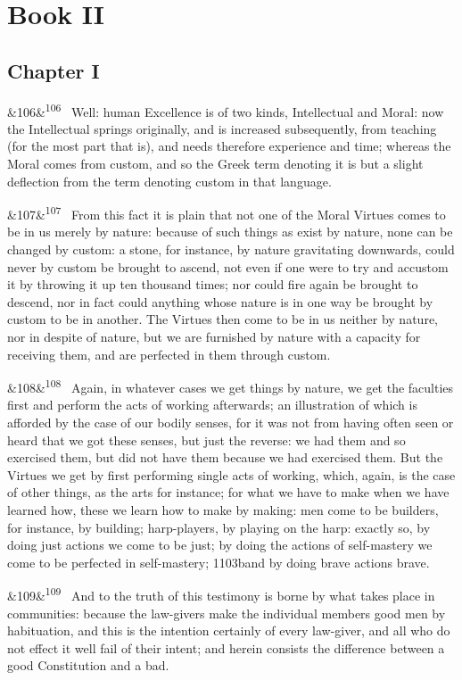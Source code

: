 \documentclass[12pt]{article}
\newcommand{\para}[1][]{\par\noindent\ifx&#1&\else\textsuperscript{\footnotesize #1}~\fi}
\begin{document}
\section*{Book II}

\subsection*{Chapter I}

\para[106] Well: human Excellence is of two kinds, Intellectual and Moral: now the Intellectual springs originally, and is increased subsequently, from teaching (for the most part that is), and needs therefore experience and time; whereas the Moral comes from custom, and so the Greek term denoting it is but a slight deflection from the term denoting custom in that language.

\para[107] From this fact it is plain that not one of the Moral Virtues comes to be in us merely by nature: because of such things as exist by nature, none can be changed by custom: a stone, for instance, by nature gravitating downwards, could never by custom be brought to ascend, not even if one were to try and accustom it by throwing it up ten thousand times; nor could fire again be brought to descend, nor in fact could anything whose nature is in one way be brought by custom to be in another. The Virtues then come to be in us neither by nature, nor in despite of nature, but we are furnished by nature with a capacity for receiving them, and are perfected in them through custom.

\para[108] Again, in whatever cases we get things by nature, we get the faculties first and perform the acts of working afterwards; an illustration of which is afforded by the case of our bodily senses, for it was not from having often seen or heard that we got these senses, but just the reverse: we had them and so exercised them, but did not have them because we had exercised them. But the Virtues we get by first performing single acts of working, which, again, is the case of other things, as the arts for instance; for what we have to make when we have learned how, these we learn how to make by making: men come to be builders, for instance, by building; harp-players, by playing on the harp: exactly so, by doing just actions we come to be just; by doing the actions of self-mastery we come to be perfected in self-mastery; 1103band by doing brave actions brave.

\para[109] And to the truth of this testimony is borne by what takes place in communities: because the law-givers make the individual members good men by habituation, and this is the intention certainly of every law-giver, and all who do not effect it well fail of their intent; and herein consists the difference between a good Constitution and a bad.
\end{document}
